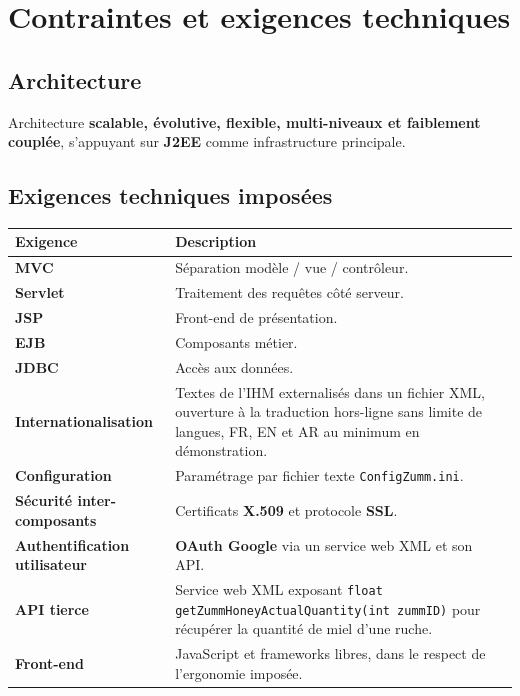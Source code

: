 \chapter{Contraintes et exigences techniques}

\section{Architecture}
Architecture \textbf{scalable, évolutive, flexible, multi-niveaux et faiblement
couplée}, s'appuyant sur \textbf{J2EE} comme infrastructure principale.

\section{Exigences techniques imposées}
\begin{longtable}{>{\bfseries}p{4cm} p{10cm}}
\toprule
\textbf{Exigence} & \textbf{Description} \\
\midrule
\endhead
MVC              & Séparation modèle / vue / contrôleur. \\
Servlet          & Traitement des requêtes côté serveur. \\
JSP              & Front-end de présentation. \\
EJB              & Composants métier. \\
JDBC             & Accès aux données. \\
Internationalisation & Textes de l'IHM externalisés dans un fichier XML, ouverture à la traduction hors-ligne sans limite de langues, FR, EN et AR au minimum en démonstration. \\
Configuration    & Paramétrage par fichier texte \texttt{ConfigZumm.ini}. \\
Sécurité inter-composants & Certificats \textbf{X.509} et protocole \textbf{SSL}. \\
Authentification utilisateur & \textbf{OAuth Google} via un service web XML et son API. \\
API tierce       & Service web XML exposant \texttt{float getZummHoneyActualQuantity(int zummID)} pour récupérer la quantité de miel d'une ruche. \\
Front-end        & JavaScript et frameworks libres, dans le respect de l'ergonomie imposée. \\
\bottomrule
\end{longtable}

